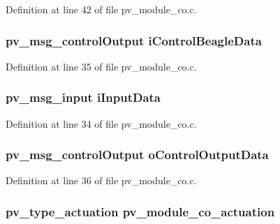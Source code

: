 Definition at line 42 of file pv\+\_\+module\+\_\+co.\+c.

\subsubsection[{\texorpdfstring{i\+Control\+Beagle\+Data}{iControlBeagleData}}]{\setlength{\rightskip}{0pt plus 5cm}pv\+\_\+msg\+\_\+control\+Output i\+Control\+Beagle\+Data}\hypertarget{group__app__co_ga01528088e36182dce9f2d7126db89886}{}\label{group__app__co_ga01528088e36182dce9f2d7126db89886}


Definition at line 35 of file pv\+\_\+module\+\_\+co.\+c.

\subsubsection[{\texorpdfstring{i\+Input\+Data}{iInputData}}]{\setlength{\rightskip}{0pt plus 5cm}pv\+\_\+msg\+\_\+input i\+Input\+Data}\hypertarget{group__app__co_gac40b8cfe5fd2000670ad57fe3e75ec89}{}\label{group__app__co_gac40b8cfe5fd2000670ad57fe3e75ec89}


Definition at line 34 of file pv\+\_\+module\+\_\+co.\+c.

\subsubsection[{\texorpdfstring{o\+Control\+Output\+Data}{oControlOutputData}}]{\setlength{\rightskip}{0pt plus 5cm}pv\+\_\+msg\+\_\+control\+Output o\+Control\+Output\+Data}\hypertarget{group__app__co_ga0a14ca4568444d2d76c256fa91585cdf}{}\label{group__app__co_ga0a14ca4568444d2d76c256fa91585cdf}


Definition at line 36 of file pv\+\_\+module\+\_\+co.\+c.

\subsubsection[{\texorpdfstring{pv\+\_\+module\+\_\+co\+\_\+actuation}{pv_module_co_actuation}}]{\setlength{\rightskip}{0pt plus 5cm}pv\+\_\+type\+\_\+actuation pv\+\_\+module\+\_\+co\+\_\+actuation}\hypertarget{group__app__co_gaf0fb0cf3bcfc492356d3cbe85376efa3}{}\label{group__app__co_gaf0fb0cf3bcfc492356d3cbe85376efa3}


